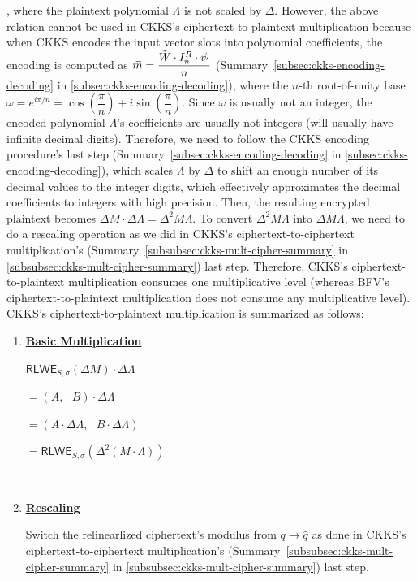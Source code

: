 , where the plaintext polynomial $\Lambda$ is not scaled by $\Delta$. However, the above relation cannot be used in CKKS's ciphertext-to-plaintext multiplication because when CKKS encodes the input vector slots into polynomial coefficients, the encoding is computed as $\vec{m} = \dfrac{\tilde W \cdot I_n^R \cdot \vec{v}_{'}}{n}$ (Summary~\ref*{subsec:ckks-encoding-decoding} in \autoref{subsec:ckks-encoding-decoding}), where the $n$-th root-of-unity base $\omega = e^{i\pi/n} = \cos \left(\dfrac{\pi}{n}\right) + i\sin \left(\dfrac{\pi}{n}\right)$. Since $\omega$ is usually not an integer, the encoded polynomial $\Lambda$'s coefficients are usually not integers (will usually have infinite decimal digits). Therefore, we need to follow the CKKS encoding procedure's last step (Summary~\ref*{subsec:ckks-encoding-decoding} in \autoref{subsec:ckks-encoding-decoding}), which scales $\Lambda$ by $\Delta$ to shift an enough number of its decimal values to the integer digits, which effectively approximates the decimal coefficients to integers with high precision. Then, the resulting encrypted plaintext becomes $\Delta M \cdot \Delta \Lambda = \Delta^2 M \Lambda$. To convert $\Delta^2 M \Lambda$ into $\Delta M \Lambda$, we need to do a rescaling operation as we did in CKKS's ciphertext-to-ciphertext multiplication's (Summary~\ref*{subsubsec:ckks-mult-cipher-summary} in \autoref{subsubsec:ckks-mult-cipher-summary}) last step. Therefore, CKKS's ciphertext-to-plaintext multiplication consumes one multiplicative level (whereas BFV's ciphertext-to-plaintext multiplication does not consume any multiplicative level). CKKS's ciphertext-to-plaintext multiplication is summarized as follows: 



\begin{tcolorbox}[title={\textbf{\tboxlabel{\ref*{subsec:ckks-mult-plain}} CKKS Ciphertext-to-Plaintext Multiplication}}]


\begin{enumerate}
\item \textbf{\underline{Basic Multiplication}}

$\textsf{RLWE}_{S, \sigma}(\Delta M) \cdot \Delta\Lambda$

$= (A, \text{ } B) \cdot \Delta\Lambda$

$= (A \cdot \Delta\Lambda, \text{ }  B \cdot \Delta\Lambda )$

$= \textsf{RLWE}_{S, \sigma}(\Delta^2 (M \cdot \Lambda) )$

$ $

\item \textbf{\underline{Rescaling}}

Switch the relinearlized ciphertext's modulus from $q \rightarrow \hat q$ as done in CKKS's ciphertext-to-ciphertext multiplication's (Summary~\ref*{subsubsec:ckks-mult-cipher-summary} in \autoref{subsubsec:ckks-mult-cipher-summary}) last step. 

\end{enumerate}

\end{tcolorbox}


